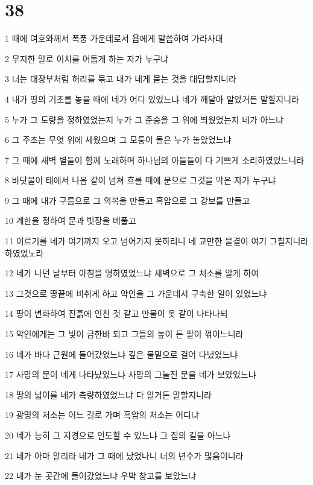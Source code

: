 \chapter{38}

\par 1 때에 여호와께서 폭풍 가운데로서 욥에게 말씀하여 가라사대
\par 2 무지한 말로 이치를 어둡게 하는 자가 누구냐
\par 3 너는 대장부처럼 허리를 묶고 내가 네게 묻는 것을 대답할지니라
\par 4 내가 땅의 기초를 놓을 때에 네가 어디 있었느냐 네가 깨달아 알았거든 말할지니라
\par 5 누가 그 도량을 정하였었는지 누가 그 준승을 그 위에 띄웠었는지 네가 아느냐
\par 6 그 주초는 무엇 위에 세웠으며 그 모퉁이 돌은 누가 놓았었느냐
\par 7 그 때에 새벽 별들이 함께 노래하며 하나님의 아들들이 다 기쁘게 소리하였었느니라
\par 8 바닷물이 태에서 나옴 같이 넘쳐 흐를 때에 문으로 그것을 막은 자가 누구냐
\par 9 그 때에 내가 구름으로 그 의복을 만들고 흑암으로 그 강보를 만들고
\par 10 계한을 정하여 문과 빗장을 베풀고
\par 11 이르기를 네가 여기까지 오고 넘어가지 못하리니 네 교만한 물결이 여기 그칠지니라 하였었노라
\par 12 네가 나던 날부터 아침을 명하였었느냐 새벽으로 그 처소를 알게 하여
\par 13 그것으로 땅끝에 비취게 하고 악인을 그 가운데서 구축한 일이 있었느냐
\par 14 땅이 변화하여 진흙에 인친 것 같고 만물이 옷 같이 나타나되
\par 15 악인에게는 그 빛이 금한바 되고 그들의 높이 든 팔이 꺾이느니라
\par 16 네가 바다 근원에 들어갔었느냐 깊은 물밑으로 걸어 다녔었느냐
\par 17 사망의 문이 네게 나타났었느냐 사망의 그늘진 문을 네가 보았었느냐
\par 18 땅의 넓이를 네가 측량하였었느냐 다 알거든 말할지니라
\par 19 광명의 처소는 어느 길로 가며 흑암의 처소는 어디냐
\par 20 네가 능히 그 지경으로 인도할 수 있느냐 그 집의 길을 아느냐
\par 21 네가 아마 알리라 네가 그 때에 났었나니 너의 년수가 많음이니라
\par 22 네가 눈 곳간에 들어갔었느냐 우박 창고를 보았느냐
